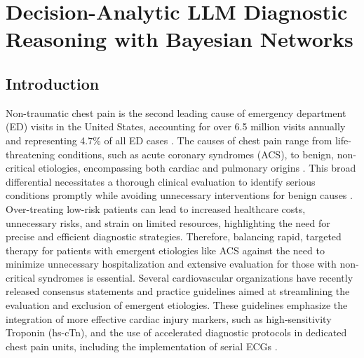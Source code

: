 \chapter{Decision-Analytic LLM Diagnostic Reasoning with Bayesian Networks} \label{chapter:bn-reasoning}

\section{Introduction}

Non-traumatic chest pain is the second leading cause of emergency department (ED) visits in the United States, accounting for over 6.5 million visits annually and representing 4.7\% of all ED cases \cite{rui2017national}. The causes of chest pain range from life-threatening conditions, such as acute coronary syndromes (ACS), to benign, non-critical etiologies, encompassing both cardiac and pulmonary origins \cite{hsiaNationalStudyPrevalence2016}. This broad differential necessitates a thorough clinical evaluation to identify serious conditions promptly while avoiding unnecessary interventions for benign causes \cite{null2021AHAACC2021}. Over-treating low-risk patients can lead to increased healthcare costs, unnecessary risks, and strain on limited resources, highlighting the need for precise and efficient diagnostic strategies. Therefore, balancing rapid, targeted therapy for patients with emergent etiologies like ACS against the need to minimize unnecessary hospitalization and extensive evaluation for those with non-critical syndromes is essential\cite{amsterdamTestingLowRiskPatients2010}. Several cardiovascular organizations have recently released consensus statements and practice guidelines aimed at streamlining the evaluation and exclusion of emergent etiologies. These guidelines emphasize the integration of more effective cardiac injury markers, such as high-sensitivity Troponin (hs-cTn), and the use of accelerated diagnostic protocols in dedicated chest pain units, including the implementation of serial ECGs \cite{leeInitialEvaluationManagement2023}. 

